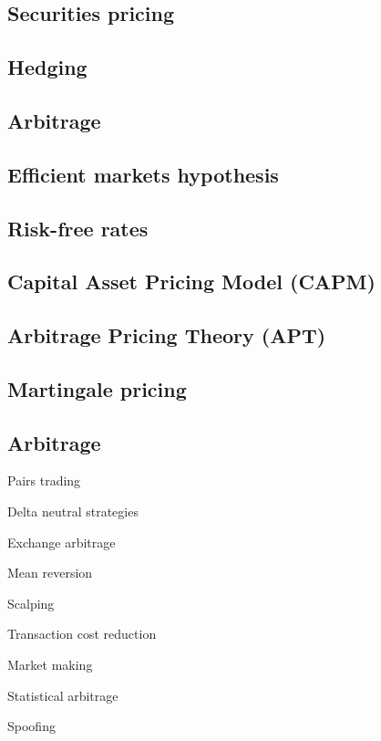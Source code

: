 
\subsection{Securities pricing}

\subsection{Hedging}

\subsection{Arbitrage}

\subsection{Efficient markets hypothesis}

\subsection{Risk-free rates}

\subsection{Capital Asset Pricing Model (CAPM)}

\subsection{Arbitrage Pricing Theory (APT)}

\subsection{Martingale pricing}

\subsection{Arbitrage}

Pairs trading

Delta neutral strategies

Exchange arbitrage

Mean reversion

Scalping

Transaction cost reduction

Market making

Statistical arbitrage

Spoofing

